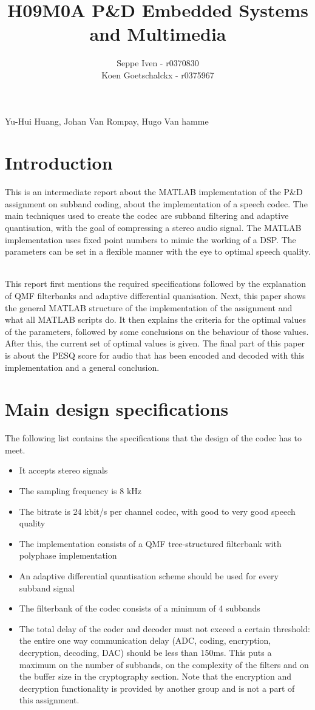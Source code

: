 \documentclass[a4paper]{article}
\title{H09M0A P\&D Embedded Systems and Multimedia}
\author{Seppe Iven - r0370830 \\ Koen Goetschalckx - r0375967}
\begin{document}
 
\maketitle
\begin{center} Yu-Hui Huang, Johan Van Rompay, Hugo Van hamme
\end{center}

\section{Introduction}
This is an intermediate report about the MATLAB implementation of the P\&D assignment on subband coding, about the implementation of a speech codec. The main techniques used to create the codec are subband filtering and adaptive quantisation, with the goal of compressing a stereo audio signal. The MATLAB implementation uses fixed point numbers to mimic the working of a DSP. The parameters can be set in a flexible manner with the eye to optimal speech quality. \

This report first mentions the required specifications followed by the explanation of QMF filterbanks and adaptive differential quanisation. Next, this paper shows the general MATLAB structure of the implementation of the assignment and what all MATLAB scripts do. It then explains the criteria for the optimal values of the parameters, followed by some conclusions on the behaviour of those values. After this, the current set of optimal values is given. The final part of this paper is about the PESQ score for audio that has been encoded and decoded with this implementation and a general conclusion.

\section{Main design specifications}
The following list contains the specifications that the design of the codec has to meet.

\begin{itemize}
\item It accepts stereo signals
\item The sampling frequency is 8 kHz
\item The bitrate is 24 kbit/s per channel codec, with good to very good speech quality
\item The implementation consists of a QMF tree-structured filterbank with polyphase implementation
\item An adaptive differential quantisation scheme should be used for every subband signal
\item The filterbank of the codec consists of a minimum of 4 subbands
\item The total delay of the coder and decoder must not exceed a certain threshold: the entire one way communication delay (ADC, coding, encryption, decryption, decoding, DAC) should be less than 150ms. This puts a maximum on the number of subbands, on the complexity of the filters and on the buffer size in the cryptography section. Note that the encryption and decryption functionality is provided by another group and is not a part of this assignment.

\end{itemize}
\end{document}
